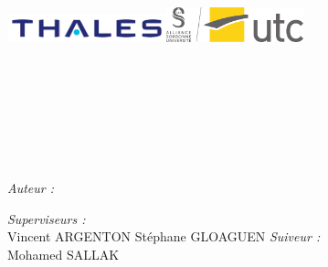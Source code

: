 
\makeatletter
  \begin{titlepage}
    \centering
    \noindent\includegraphics[height=0.8cm]{ressources/images/logos/Thales_Logo.png}\hfill\includegraphics[height=1cm]{ressources/images/logos/logo_UTC.png}\\
    \vfill

    \textsc{\Large \reporttitle}\\[0.5cm]
    \HRule \\[0.4cm]
    {\huge \bfseries \reportsubject}\\[0.4cm]
    \HRule \\[1.5cm]
    \textsc{\large \reportdetails}\\[0.5cm]
    \textsc{\large \reportdates}\\[0.5cm]

    \vfill

    \begin{minipage}[t]{0.3\textwidth}
      \begin{flushleft} \large
        \emph{Auteur :}\\
        \reportauthor
      \end{flushleft}
    \end{minipage}
    \begin{minipage}[t]{0.6\textwidth}
      \begin{flushright} \large
        \emph{Superviseurs :} \\
		Vincent \textsc{ARGENTON}
		\linebreak
		Stéphane \textsc{GLOAGUEN} 
		\linebreak
		\emph{Suiveur :} \\
		Mohamed \textsc{SALLAK} 
    
      \end{flushright}
    \end{minipage}
  \end{titlepage}

\makeatother
